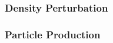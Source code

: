 \documentclass{article}
\begin{document}
        \subsubsection{Density Perturbation}

        \subsubsection{Particle Production}





\end{document}
